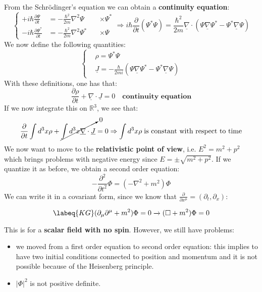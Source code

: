 \documentclass[../main.tex]{subfiles}
\begin{document}
From the Schr\"odinger's equation we can obtain a \textbf{continuity equation}:
\[
\left\{
\begin{aligned}
+i\hbar\frac{\partial\Psi}{\partial t}&=-\frac{\hbar^2}{2m}\nabla^2\Psi &\, &\times\Psi^*\\
-i\hbar\frac{\partial\Psi^*}{\partial t}&=-\frac{\hbar^2}{2m}\nabla^2\Psi^* &\, &\times\Psi
\end{aligned}
\right.
\Rightarrow
i\hbar\frac{\partial}{\partial t}(\Psi^*\Psi)=\frac{\hbar^2}{2m}\underline{\nabla}\cdot(\Psi\underline{\nabla}\Psi^*-\Psi^*\underline{\nabla}\Psi)
\]
We now define the following quantities:
\[
\left\{
\begin{aligned}
&\rho=\Psi^*\Psi\\
&\underline{J}=-\frac{\hbar}{2mi}(\Psi\underline{\nabla}\Psi^*-\Psi^*\underline{\nabla}\Psi)
\end{aligned}
\right.
\]
With these definitions, one has that:
\[
\frac{\partial\rho}{\partial t}+\underline{\nabla}\cdot\underline{J}=0 \quad  \textbf{continuity equation}
\]
If we now integrate this on $\mathbb{R}^3$, we see that:
\[
\frac{\partial}{\partial t}\int d^3x\rho+\cancelto{0}{\int d^3x\underline{\nabla}\cdot\underline{J}}=0\Rightarrow\int d^3x\rho \; \text{is constant with respect to time}
\]
We now want to move to the \textbf{relativistic point of view}, i.e. $E^2=m^2+p^2$ which brings problems with negative energy since $E=\pm\sqrt{m^2+p^2}$. If we quantize it as before, we obtain a second order equation:
\[
-\frac{\partial^2}{\partial t^2}\Phi=(-\nabla^2+m^2)\Phi
\]
We can write it in a covariant form, since we know that $\frac{\partial}{\partial x^{\mu}}=(\partial_t,\partial_x)$:
\begin{kaobox}[frametitle=Klein-Gordon equation]
\begin{equation}
\labeq{KG}
(\partial_{\mu}\partial^{\mu}+m^2)\Phi=0\xrightarrow[]{}(\Box+m^2)\Phi=0 
\end{equation}
\end{kaobox}
This is for a \textbf{scalar field with no spin}. However, we still have problems:
\begin{itemize}
    \item we moved from a first order equation to second order equation: this implies to have two initial conditions connected to position and momentum and it is not possible because of the Heisenberg principle.
    \item $|\Phi|^2$ is not positive definite.
\end{itemize}
\end{document}
